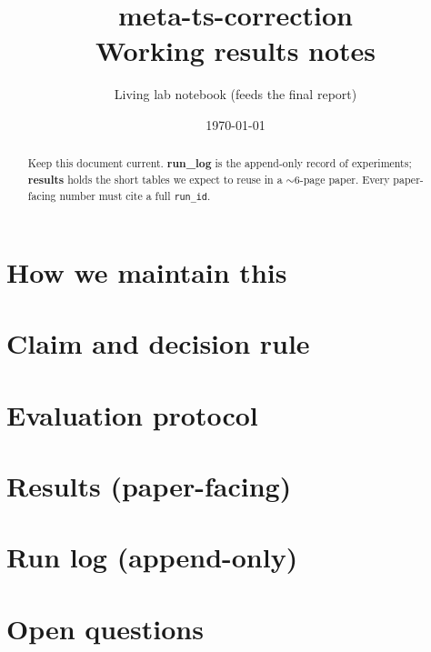 \documentclass[11pt]{article}
\title{meta-ts-correction \\ \large Working results notes}
\author{Living lab notebook (feeds the final report)}
\date{\today}
\begin{document}
\maketitle

\begin{abstract}
Keep this document current. \textbf{run\_log} is the append-only record of
experiments; \textbf{results} holds the short tables we expect to reuse in a
$\sim$6-page paper. Every paper-facing number must cite a full
\texttt{run\_id}.
\end{abstract}

\section{How we maintain this}


\section{Claim and decision rule}


\section{Evaluation protocol}


\section{Results (paper-facing)}


\section{Run log (append-only)}


\section{Open questions}

\end{document}
